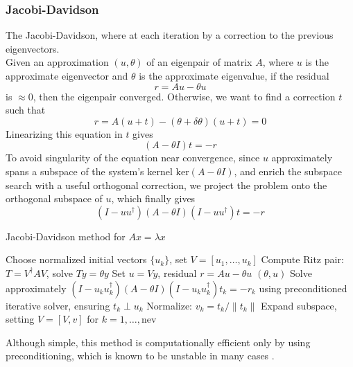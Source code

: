 \subsubsection{Jacobi-Davidson}
The Jacobi-Davidson, where at each iteration by a correction to the previous eigenvectors.
\\Given an approximation $(u, \theta)$ of an eigenpair of matrix $A$, where $u$ is the approximate eigenvector and $\theta$ is the approximate eigenvalue, if the residual
\begin{equation}
    \label{eq:residual}
    r= A u - \theta u
\end{equation}
is $\approx 0$, then the eigenpair converged. Otherwise, we want to find a correction $t$ such that 
\begin{equation}
    \label{eq:jacobi_correction}
    r= A(u+t) - (\theta + \delta \theta) (u+t) = 0 
\end{equation}
Linearizing this equation in $t$ gives
\begin{equation}
   (A - \theta  I ) t = -r 
\end{equation}
To avoid singularity of the equation near convergence, since $u$ approximately spans a subspace of the system's kernel $\text{ker} (A-\theta I)$, and enrich the subspace search with a useful orthogonal correction, we project the problem onto the orthogonal subspace of $u$, which finally gives
\begin{equation}
    \label{eq:jacobi_eq_proj}
    ( I - uu^\dagger) (A - \theta  I )(I - u u^\dagger) t = -r
\end{equation}
\begin{algorithm}[H]
\caption{Jacobi-Davidson method for $A x = \lambda x$}
\begin{algorithmic}[1]
\STATE Choose normalized initial vectors $\{u_k\}$, set $V = [u_1, \ldots, u_{k}]$
\REPEAT
    \STATE Compute Ritz pair: $T = V^\dagger A V$, solve $T y = \theta y$
    \STATE Set $u = V y$, residual $r = A u - \theta u$
         \RETURN $(\theta, u)$
    \ENDIF
    \STATE Solve approximately $(I - u_k u_k^\dagger)(A - \theta I)(I - u_k u_k^\dagger) t_k = -r_k$
        using preconditioned iterative solver, ensuring $t_k \perp u_k$
    \STATE Normalize: $v_k = t_k / \|t_k\|$
    \STATE Expand subspace, setting $V = [V, v]$
for $k = 1, \dots, \text{nev}$
\end{algorithmic}
\end{algorithm}
Although simple, this method is computationally efficient only by using preconditioning, which is known to be unstable in many cases \cite{Saad1992}.
